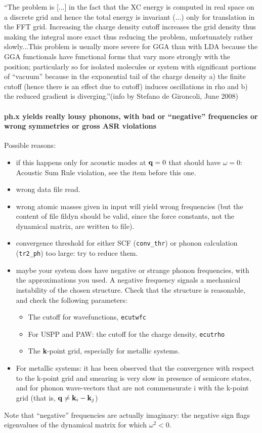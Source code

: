 \documentclass[12pt,a4paper]{article}
\begin{document}
``The problem is [...] in the fact that the XC 
energy is computed in real space on a discrete grid and hence the
total energy is invariant (...) only for translation in the FFT
grid. Increasing the charge density cutoff increases the grid density
thus making the integral more exact thus reducing the problem,
unfortunately rather slowly...This problem is usually more severe for
GGA  than with LDA because the GGA functionals have functional forms
that vary more strongly with the position; particularly so for
isolated molecules or system with significant portions of ``vacuum''
because in the exponential tail of the charge density a) the finite
cutoff  (hence there is an effect due to cutoff) induces oscillations
in rho and b) the reduced gradient is diverging.''(info by Stefano de
Gironcoli, June 2008) 

\paragraph{ph.x yields really lousy phonons, with bad or ``negative''
  frequencies or wrong symmetries or gross ASR violations} 
Possible reasons:
\begin{itemize}
\item if this happens only for acoustic modes at ${\bf q}=0$ that should
  have $\omega=0$: Acoustic Sum Rule violation, see the item before
  this one.
\item wrong data file read.
\item wrong atomic masses given in input will yield wrong frequencies
  (but the content of file fildyn should be valid, since the force
  constants, not the dynamical matrix, are written to file). 
\item convergence threshold for either SCF (\texttt{conv\_thr}) or phonon
  calculation (\texttt{tr2\_ph}) too large: try to reduce them. 
\item maybe your system does have negative or strange phonon
  frequencies, with the approximations you used. A negative frequency
  signals a mechanical instability of the chosen structure. Check that
  the structure is reasonable, and check the following parameters: 
\begin{itemize}
\item The cutoff for wavefunctions, \texttt{ecutwfc}
\item For USPP and PAW: the cutoff for the charge density, \texttt{ecutrho}
\item The {\bf k}-point grid, especially for metallic systems.
\end{itemize}
\item For metallic systems: it has been observed that the convergence with
  respect to the k-point grid and smearing is very slow in presence of
  semicore states, and for phonon wave-vectors that are not commensurate i
  with the k-point grid (that is, ${\bf q}\ne {\bf k}_i-{\bf k}_j$)
\end{itemize}
Note that ``negative'' frequencies are actually imaginary: the negative
sign flags eigenvalues of the dynamical matrix for which $\omega^2 <
0$. 
\end{document}

